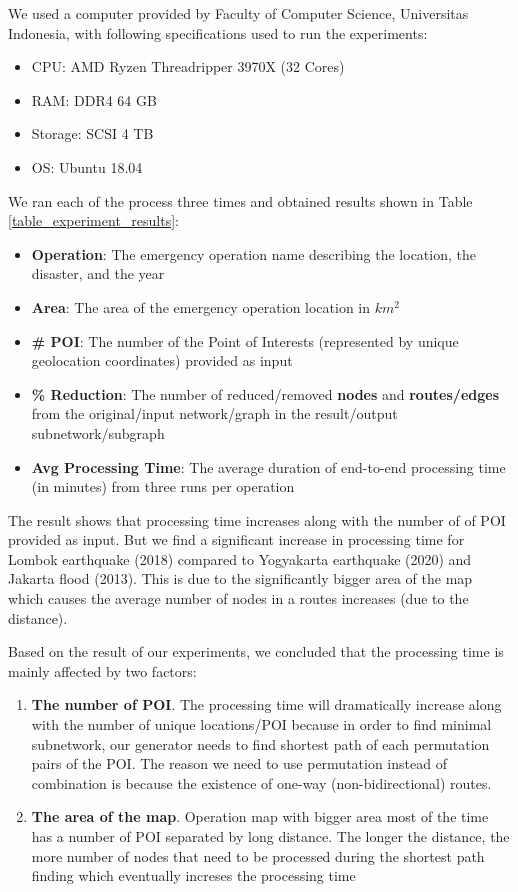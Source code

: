 \documentclass[conference]{IEEEtran}
\begin{document}
We used a computer provided by Faculty of Computer Science, Universitas Indonesia, with following specifications used to run the experiments:

\begin{itemize}
\item CPU: AMD Ryzen Threadripper 3970X (32 Cores)
\item RAM: DDR4 64 GB
\item Storage: SCSI 4 TB
\item OS: Ubuntu 18.04
\end{itemize}

We ran each of the process three times and obtained results shown in Table \ref{table_experiment_results}:

\begin{itemize}
\item \textbf{Operation}: The emergency operation name describing the location, the disaster, and the year
\item \textbf{Area}: The area of the emergency operation location in $km^2$
\item \textbf{\# POI}: The number of the Point of Interests (represented by unique geolocation coordinates) provided as input
\item \textbf{\% Reduction}: The number of reduced/removed \textbf{nodes} and \textbf{routes/edges} from the original/input network/graph in the result/output subnetwork/subgraph
\item \textbf{Avg Processing Time}: The average duration of end-to-end processing time (in minutes) from three runs per operation
\end{itemize}

The result shows that processing time increases along with the number of of POI provided as input. But we find a significant increase in processing time for Lombok earthquake (2018) compared to Yogyakarta earthquake (2020) and Jakarta flood (2013). This is due to the significantly bigger area of the map which causes the average number of nodes in a routes increases (due to the distance).

Based on the result of our experiments, we concluded that the processing time is mainly affected by two factors:

\begin{enumerate}
\item \textbf{The number of POI}. The processing time will dramatically increase along with the number of unique locations/POI because in order to find minimal subnetwork, our generator needs to find shortest path of each permutation pairs of the POI. The reason we need to use permutation instead of combination is because the existence of one-way (non-bidirectional) routes.
\item \textbf{The area of the map}. Operation map with bigger area most of the time has a number of POI separated by long distance. The longer the distance, the more number of nodes that need to be processed during the shortest path finding which eventually increses the processing time
\end{enumerate}
\end{document}
